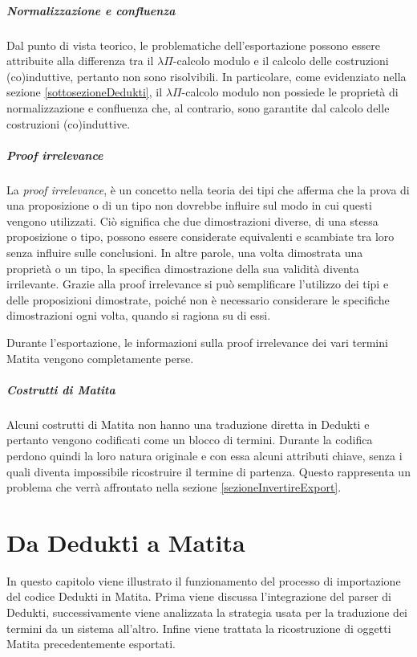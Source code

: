 \documentclass[12pt,a4paper]{mimosis}
\begin{document}
\paragraph{Normalizzazione e confluenza}
Dal punto di vista teorico, le problematiche dell'esportazione possono essere attribuite
alla differenza tra il $\lambda\Pi$-calcolo modulo e il calcolo delle costruzioni (co)induttive,
 pertanto non sono risolvibili. In particolare, come evidenziato nella sezione 
\ref{sottosezioneDedukti}, il $\lambda\Pi$-calcolo modulo non possiede le proprietà di normalizzazione
e confluenza che, al contrario, sono garantite dal calcolo delle costruzioni (co)induttive.

\paragraph{Proof irrelevance}
La \textit{proof irrelevance}, è un concetto nella teoria dei tipi che afferma che la prova di una 
proposizione o di un tipo non dovrebbe influire sul modo in cui questi vengono utilizzati.
Ciò significa che due dimostrazioni diverse, di una stessa proposizione o tipo, possono essere
considerate equivalenti e scambiate tra loro senza influire sulle conclusioni. In altre parole,
una volta dimostrata una proprietà o un tipo, la specifica dimostrazione della sua validità 
diventa irrilevante. Grazie alla proof irrelevance si può semplificare l'utilizzo dei tipi e delle
proposizioni dimostrate, poiché non è necessario considerare le specifiche dimostrazioni ogni volta,
quando si ragiona su di essi. 

Durante l'esportazione, le informazioni sulla proof irrelevance dei vari termini Matita vengono 
completamente perse.

\paragraph{Costrutti di Matita}
Alcuni costrutti di Matita non hanno una traduzione diretta in Dedukti
e pertanto vengono codificati come un blocco di termini. Durante la codifica
perdono quindi la loro natura originale e con essa alcuni attributi chiave, 
senza i quali diventa impossibile ricostruire il termine di partenza. 
Questo rappresenta un problema che verrà affrontato nella sezione \ref{sezioneInvertireExport}. 

\chapter{Da Dedukti a Matita}
In questo capitolo viene illustrato il funzionamento del processo di importazione
del codice Dedukti in Matita. Prima viene discussa l'integrazione del parser 
di Dedukti, successivamente viene analizzata la strategia usata per la traduzione
dei termini da un sistema all'altro. Infine viene trattata la ricostruzione
di oggetti Matita precedentemente esportati.
\end{document}

